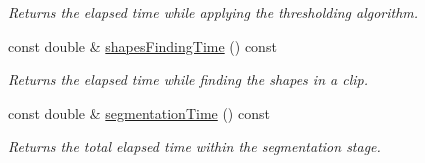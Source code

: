 \begin{CompactItemize}
\begin{CompactList}\small\item\em Returns the elapsed time while applying the thresholding algorithm. \item\end{CompactList}\item 
const double \& \hyperlink{class_statistics_9437fbc6726c6179b3ee4c130520e642}{shapesFindingTime} () const 
\begin{CompactList}\small\item\em Returns the elapsed time while finding the shapes in a clip. \item\end{CompactList}\item 
const double \& \hyperlink{class_statistics_f4c992e9970bce97b9a33100db689739}{segmentationTime} () const 
\begin{CompactList}\small\item\em Returns the total elapsed time within the segmentation stage. \item\end{CompactList}\end{CompactItemize}
